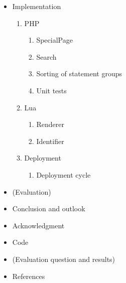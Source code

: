 \documentclass[11pt]{article}
\begin{document}
  \begin{itemize}
  \item Implementation
  \begin{enumerate}
   \item PHP
   \begin{enumerate}
    \item SpecialPage
    \item Search
    \item Sorting of statement groups
    \item Unit tests
   \end{enumerate}
   \item Lua
   \begin{enumerate}
    \item Renderer
    \item Identifier
   \end{enumerate}
   \item Deployment
   \begin{enumerate}
    \item Deployment cycle
   \end{enumerate}
  \end{enumerate}
  \item (Evaluation)
  \item Conclusion and outlook
  \item Acknowledgment
  \item Code
  \item (Evaluation question and results)
  \item References
\end{itemize}
\end{document}
